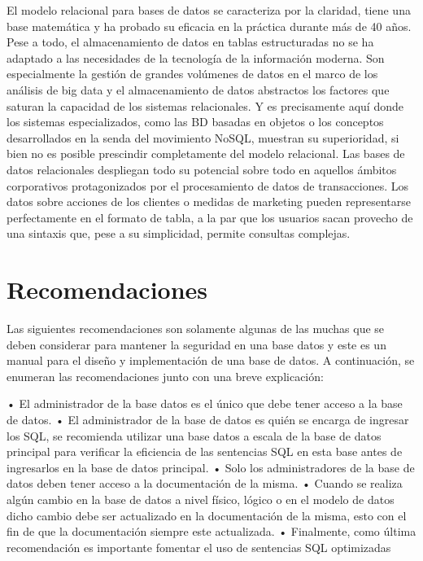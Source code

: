 \documentclass[twoside,twocolumn]{article}
\begin{document}
El modelo relacional para bases de datos se caracteriza por la claridad, tiene una base matemática y ha probado su eficacia en la práctica durante más de 40 años. Pese a todo, el almacenamiento de datos en tablas estructuradas no se ha adaptado a las necesidades de la tecnología de la información moderna.
Son especialmente la gestión de grandes volúmenes de datos en el marco de los análisis de big data y el almacenamiento de datos abstractos los factores que saturan la capacidad de los sistemas relacionales. Y es precisamente aquí donde los sistemas especializados, como las BD basadas en objetos o los conceptos desarrollados en la senda del movimiento NoSQL, muestran su superioridad, si bien no es posible prescindir completamente del modelo relacional. Las bases de datos relacionales despliegan todo su potencial sobre todo en aquellos ámbitos corporativos protagonizados por el procesamiento de datos de transacciones.
Los datos sobre acciones de los clientes o medidas de marketing pueden representarse perfectamente en el formato de tabla, a la par que los usuarios sacan provecho de una sintaxis que, pese a su simplicidad, permite consultas complejas.

\section{Recomendaciones}

Las siguientes recomendaciones son solamente algunas de las muchas que se deben considerar para mantener la seguridad en una base datos y este es un manual para el diseño y implementación de una base de datos. A continuación, se enumeran las recomendaciones junto con una breve explicación:

 •	El administrador de la base datos es el único que debe tener acceso a la base de datos.
 •	El administrador de la base de datos es quién se encarga de ingresar los SQL, se recomienda utilizar una base datos a escala de la base de datos principal para verificar la eficiencia de las sentencias SQL en esta base antes de ingresarlos en la base de datos principal.
 •	Solo los administradores de la base de datos deben tener acceso a la documentación de la misma.
 •	Cuando se realiza algún cambio en la base de datos a nivel físico, lógico o en el modelo de datos dicho cambio debe ser actualizado en la documentación de la misma, esto con el fin de que la documentación siempre este actualizada.
 •	Finalmente, como última recomendación es importante fomentar el uso de sentencias SQL optimizadas
 
\end{document}
